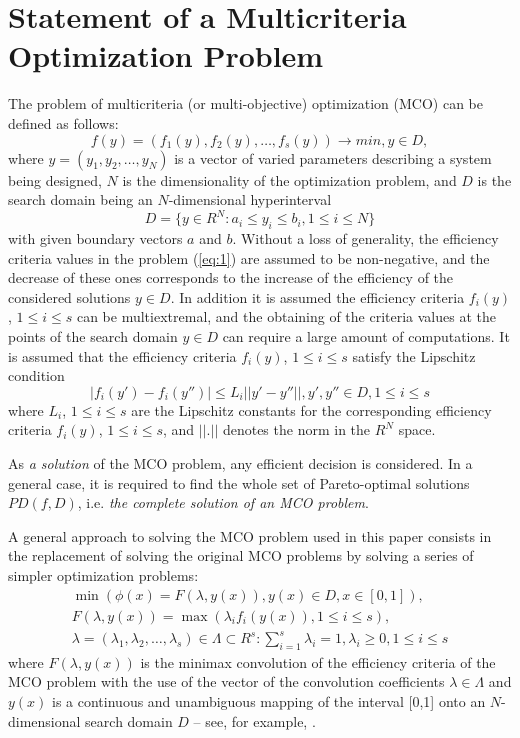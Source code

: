 \documentclass[runningheads]{llncs}
\begin{document}
\section{Statement of a Multicriteria Optimization Problem}
\label{sec:2}
The problem of multicriteria (or multi-objective) optimization (MCO) can be defined as follows:
\begin{equation}
f(y) =(f_1 (y),f_2 (y),\dots,f_s (y) )\to min,y\in D,	
\label{eq:1}
\end{equation}
where $y = (y_1,y_2,\dots,y_N)$ is a vector of varied parameters describing a system being designed, $N$ is the dimensionality of the optimization problem, and $D$ is the search domain being an $N$-dimensional hyperinterval
\begin{equation*}
D= \{ y \in R^N: a_i \leq y_i \leq b_i,1 \leq i \leq N \}
\end{equation*}
with given boundary vectors $a$ and $b$. Without a loss of generality, the efficiency criteria values in the problem (\ref{eq:1}) are assumed to be non-negative, and the decrease of these ones corresponds to the increase of the efficiency of the considered solutions $y \in D$. In addition it is assumed the efficiency criteria $f_i(y)$, $1 \leq i \leq s$ can be multiextremal, and the obtaining of the criteria values at the points of the search domain $y \in D$ can require a large amount of computations. It is assumed that the efficiency criteria $f_i(y)$, $1 \leq i \leq s$ satisfy the Lipschitz condition
\begin{equation}
|f_i (y') - f_i (y'') | \leq L_i ||y' - y''||, y', y'' \in D, 1\leq i\leq s	
\label{eq:2}
\end{equation}
where $L_i$, $1 \leq i \leq s$ are the Lipschitz constants for the corresponding efficiency criteria $f_i(y)$, $1 \leq i \leq s$, and $||.||$  denotes the norm in the $R^N$ space. 

As \textit{a solution} of the MCO problem, any efficient decision  is considered. In a general case, it is required to find the whole set of Pareto-optimal solutions $PD(f,D)$, i.e. \textit{the complete solution of an MCO problem}.

A general approach to solving the MCO problem used in this paper consists in the replacement of solving the original MCO problems by solving a series of simpler optimization problems: 
\begin{equation}\label{eq:3}
\begin{split}
\min{(\phi(x) = F(\lambda, y(x)), y(x) \in D, x \in [0,1])},\\
F(\lambda,y(x))=\max{(\lambda_i f_i(y(x)), 1 \leq i \leq s)},\\
\lambda=(\lambda_1,\lambda_2,\dots,\lambda_s) \in \Lambda \subset R^s : \sum_{i=1}^s{\lambda_i}=1, \lambda_i \geq 0, 1 \leq i \leq s
\end{split}
\end{equation}
where $F(\lambda,y(x))$ is the minimax convolution of the efficiency criteria of the MCO problem \cite{c2,c6,c19} with the use of the vector of the convolution coefficients $\lambda \in \Lambda$ and $y(x)$ is a continuous and unambiguous mapping of the interval [0,1] onto an $N$-dimensional search domain $D$ -- see, for example, \cite{c7,c8}.
\end{document}
